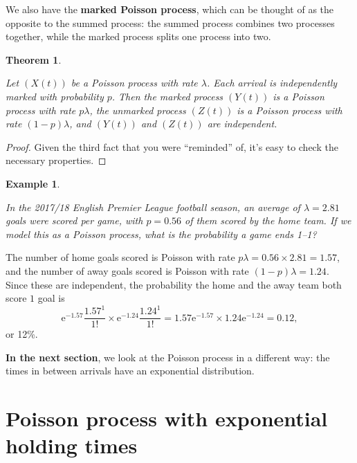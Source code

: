 \documentclass[
  a4paper,
]{article}
\newtheorem{theorem}{Theorem}[section]
\theoremstyle{definition}
\theoremstyle{definition}
\newtheorem{example}{Example}[section]
\theoremstyle{definition}
\theoremstyle{remark}
\begin{document}
We also have the \textbf{marked Poisson process}, which can be thought of as the opposite to the summed process: the summed process combines two processes together, while the marked process splits one process into two.

\begin{theorem}
\protect\hypertarget{thm:marked}{}\label{thm:marked}

Let \((X(t))\) be a Poisson process with rate \(\lambda\). Each arrival is independently marked with probability \(p\). Then the marked process \((Y(t))\) is a Poisson process with rate \(p\lambda\), the unmarked process \((Z(t))\) is a Poisson process with rate \((1-p)\lambda\), and \((Y(t))\) and \((Z(t))\) are independent.

\end{theorem}

\begin{proof}

Given the third fact that you were ``reminded'' of, it's easy to check the necessary properties.

\end{proof}

\begin{example}
\protect\hypertarget{exm:pois-ex-4}{}\label{exm:pois-ex-4}

\emph{In the 2017/18 English Premier League football season, an average of \(\lambda = 2.81\) goals were scored per game, with \(p = 0.56\) of them scored by the home team. If we model this as a Poisson process, what is the probability a game ends 1--1?}

The number of home goals scored is Poisson with rate \(p\lambda = 0.56\times 2.81 = 1.57\), and the number of away goals scored is Poisson with rate \((1-p)\lambda = 1.24\). Since these are independent, the probability the home and the away team both score \(1\) goal is
\[ \mathrm{e}^{-1.57} \frac{1.57^1}{1!} \times  \mathrm{e}^{-1.24} \frac{1.24^1}{1!} = 1.57\mathrm{e}^{-1.57} \times 1.24 \mathrm{e}^{-1.24} =  0.12, \]
or 12\%.

\end{example}

\textbf{In the next section}, we look at the Poisson process in a different way: the times in between arrivals have an exponential distribution.

\hypertarget{S14-poisson-exponential}{%
\section{Poisson process with exponential holding times}\label{S14-poisson-exponential}}
\end{document}
